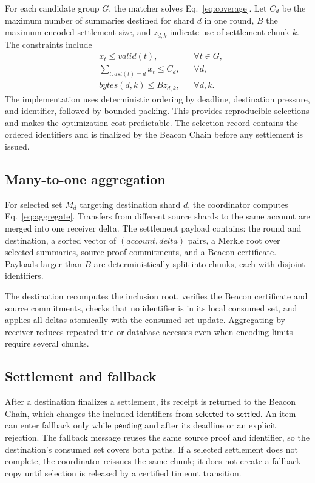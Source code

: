 \documentclass[sigconf,anonymous,review]{acmart}
\begin{document}
For each candidate group $G$, the matcher solves Eq.~\eqref{eq:coverage}. Let $C_d$ be the maximum number of summaries destined for shard $d$ in one round, $B$ the maximum encoded settlement size, and $z_{d,k}$ indicate use of settlement chunk $k$. The constraints include
\begin{align}
 &x_t \leq valid(t), &&\forall t\in G,\\
 &\sum_{t:dst(t)=d}x_t \leq C_d, &&\forall d,\\
 &bytes(d,k)\leq Bz_{d,k}, &&\forall d,k.
\end{align}
The implementation uses deterministic ordering by deadline, destination pressure, and identifier, followed by bounded packing. This provides reproducible selections and makes the optimization cost predictable. The selection record contains the ordered identifiers and is finalized by the Beacon Chain before any settlement is issued.

\subsection{Many-to-one aggregation}

For selected set $M_d$ targeting destination shard $d$, the coordinator computes Eq.~\eqref{eq:aggregate}. Transfers from different source shards to the same account are merged into one receiver delta. The settlement payload contains: the round and destination, a sorted vector of $(account,delta)$ pairs, a Merkle root over selected summaries, source-proof commitments, and a Beacon certificate. Payloads larger than $B$ are deterministically split into chunks, each with disjoint identifiers.

The destination recomputes the inclusion root, verifies the Beacon certificate and source commitments, checks that no identifier is in its local consumed set, and applies all deltas atomically with the consumed-set update. Aggregating by receiver reduces repeated trie or database accesses even when encoding limits require several chunks.

\subsection{Settlement and fallback}

After a destination finalizes a settlement, its receipt is returned to the Beacon Chain, which changes the included identifiers from $\mathsf{selected}$ to $\mathsf{settled}$. An item can enter fallback only while $\mathsf{pending}$ and after its deadline or an explicit rejection. The fallback message reuses the same source proof and identifier, so the destination's consumed set covers both paths. If a selected settlement does not complete, the coordinator reissues the same chunk; it does not create a fallback copy until selection is released by a certified timeout transition.
\end{document}
